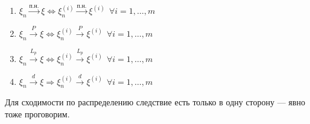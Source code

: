 \begin{proposition}~
    \begin{enumerate}
        \item $\xi_n \xrightarrow{\text{п.н.}} \xi \Longleftrightarrow \xi_n^{(i)} \xrightarrow{\text{п.н.}} \xi^{(i)} \ \ \forall i = 1, \hdots, m$

        \item $\xi_n \xrightarrow{P} \xi \Longleftrightarrow \xi_n^{(i)} \xrightarrow{P} \xi^{(i)} \ \ \forall i = 1, \hdots, m$

        \item $\xi_n \xrightarrow{L_p} \xi \Longleftrightarrow \xi_n^{(i)} \xrightarrow{L_p} \xi^{(i)} \ \ \forall i = 1, \hdots, m$

        \item $\xi_n \xrightarrow{d} \xi \Longrightarrow \xi_n^{(i)} \xrightarrow{d} \xi^{(i)} \ \ \forall i = 1, \hdots, m$
    \end{enumerate}
\end{proposition}

\begin{note}
    Для сходимости по распределению следствие есть только в одну сторону --- явно тоже проговорим.
\end{note}

